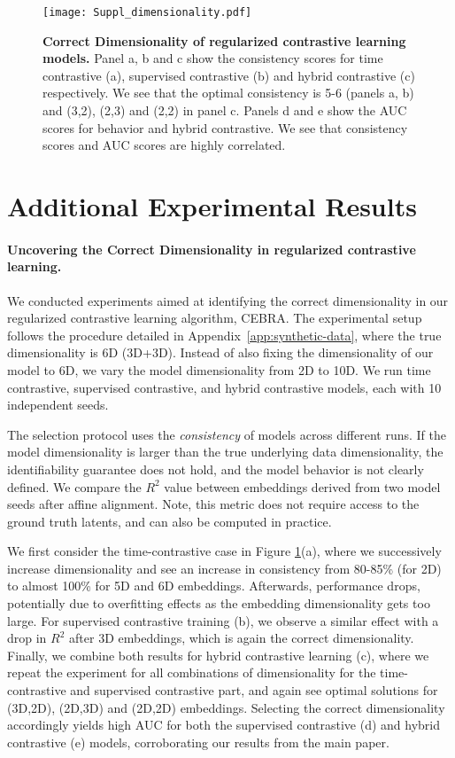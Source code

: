 \begin{figure}[th]
    \centering
    \texttt{[image: Suppl\_dimensionality.pdf]}
    \caption{\textbf{Correct Dimensionality of regularized contrastive learning models.} Panel a, b and c show the consistency scores for time contrastive (a), supervised contrastive (b) and hybrid contrastive (c) respectively. We see that the optimal consistency is 5-6 (panels a, b) and (3,2), (2,3) and (2,2) in panel c. Panels d and e show the AUC scores for behavior and hybrid contrastive. We see that consistency scores and AUC scores are highly correlated.
    }
    \label{fig:dimensionality}
\end{figure}

\section{Additional Experimental Results}

\paragraph{Uncovering the Correct Dimensionality in regularized contrastive learning.} We conducted experiments aimed at identifying the correct dimensionality in our regularized contrastive learning algorithm, CEBRA. The experimental setup follows the procedure detailed in Appendix~\ref{app:synthetic-data}, where the true dimensionality is 6D (3D+3D). Instead of also fixing the dimensionality of our model to 6D, we vary the model dimensionality from 2D to 10D. We run time contrastive, supervised contrastive, and hybrid contrastive models, each with 10 independent seeds.

The selection protocol uses the \emph{consistency} of models across different runs. If the model dimensionality is larger than the true underlying data dimensionality, the identifiability guarantee does not hold, and the model behavior is not clearly defined. We compare the $R^2$ value between embeddings derived from two model seeds after affine alignment. Note, this metric does not require access to the ground truth latents, and can also be computed in practice.

We first consider the time-contrastive case in Figure \ref{fig:dimensionality}(a), where we successively increase dimensionality and see an increase in consistency from 80-85\% (for 2D) to almost 100\% for 5D and 6D embeddings. Afterwards, performance drops, potentially due to overfitting effects as the embedding dimensionality gets too large.
For supervised contrastive training (b), we observe a similar effect with a drop in $R^2$ after 3D embeddings, which is again the correct dimensionality.
Finally, we combine both results for hybrid contrastive learning (c), where we repeat the experiment for all combinations of dimensionality for the time-contrastive and supervised contrastive part, and again see optimal solutions for (3D,2D), (2D,3D) and (2D,2D) embeddings.
Selecting the correct dimensionality accordingly yields high AUC for both the supervised contrastive (d) and hybrid contrastive (e) models, corroborating our results from the main paper.


